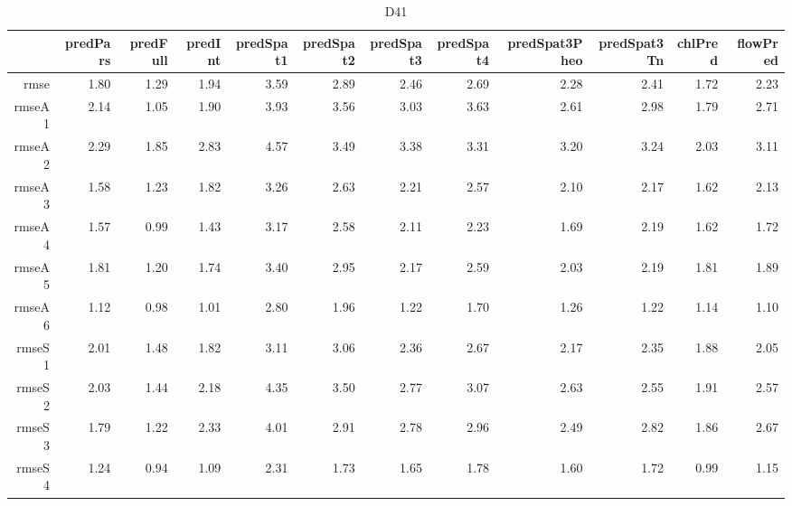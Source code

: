 \begin{table}[H]
\centering
\begingroup\fontsize{2.5pt}{4pt}\selectfont
\begin{tabular}{rrrrrrrrrrrr}
  \hline
 & predPars & predFull & predInt & predSpat1 & predSpat2 & predSpat3 & predSpat4 & predSpat3Pheo & predSpat3Tn & chlPred & flowPred \\ 
  \hline
rmse & 1.80 & 1.29 & 1.94 & 3.59 & 2.89 & 2.46 & 2.69 & 2.28 & 2.41 & 1.72 & 2.23 \\ 
  rmseA1 & 2.14 & 1.05 & 1.90 & 3.93 & 3.56 & 3.03 & 3.63 & 2.61 & 2.98 & 1.79 & 2.71 \\ 
  rmseA2 & 2.29 & 1.85 & 2.83 & 4.57 & 3.49 & 3.38 & 3.31 & 3.20 & 3.24 & 2.03 & 3.11 \\ 
  rmseA3 & 1.58 & 1.23 & 1.82 & 3.26 & 2.63 & 2.21 & 2.57 & 2.10 & 2.17 & 1.62 & 2.13 \\ 
  rmseA4 & 1.57 & 0.99 & 1.43 & 3.17 & 2.58 & 2.11 & 2.23 & 1.69 & 2.19 & 1.62 & 1.72 \\ 
  rmseA5 & 1.81 & 1.20 & 1.74 & 3.40 & 2.95 & 2.17 & 2.59 & 2.03 & 2.19 & 1.81 & 1.89 \\ 
  rmseA6 & 1.12 & 0.98 & 1.01 & 2.80 & 1.96 & 1.22 & 1.70 & 1.26 & 1.22 & 1.14 & 1.10 \\ 
  rmseS1 & 2.01 & 1.48 & 1.82 & 3.11 & 3.06 & 2.36 & 2.67 & 2.17 & 2.35 & 1.88 & 2.05 \\ 
  rmseS2 & 2.03 & 1.44 & 2.18 & 4.35 & 3.50 & 2.77 & 3.07 & 2.63 & 2.55 & 1.91 & 2.57 \\ 
  rmseS3 & 1.79 & 1.22 & 2.33 & 4.01 & 2.91 & 2.78 & 2.96 & 2.49 & 2.82 & 1.86 & 2.67 \\ 
  rmseS4 & 1.24 & 0.94 & 1.09 & 2.31 & 1.73 & 1.65 & 1.78 & 1.60 & 1.72 & 0.99 & 1.15 \\ 
   \hline
\end{tabular}
\endgroup
\caption{D41} 
\end{table}
